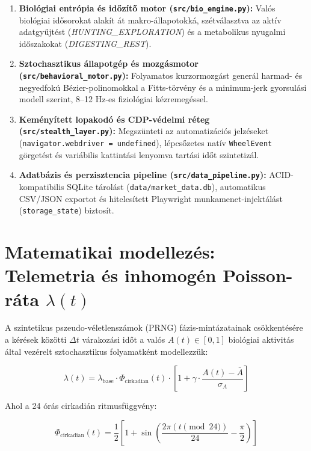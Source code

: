 \documentclass[11pt,a4paper]{article}
\begin{document}
\begin{enumerate}
    \item \textbf{Biológiai entrópia és időzítő motor (\texttt{src/bio\_engine.py}):} 
    Valós biológiai idősorokat alakít át makro-állapotokká, szétválasztva az aktív adatgyűjtést (\textit{HUNTING\_EXPLORATION}) és a metabolikus nyugalmi időszakokat (\textit{DIGESTING\_REST}).
    
    \item \textbf{Sztochasztikus állapotgép és mozgásmotor (\texttt{src/behavioral\_motor.py}):} 
    Folyamatos kurzormozgást generál harmad- és negyedfokú Bézier-polinomokkal a Fitts-törvény és a minimum-jerk gyorsulási modell szerint, 8--12 Hz-es fiziológiai kézremegéssel.
    
    \item \textbf{Keményített lopakodó és CDP-védelmi réteg (\texttt{src/stealth\_layer.py}):} 
    Megszünteti az automatizációs jelzéseket (\texttt{navigator.webdriver = undefined}), lépcsőzetes natív \texttt{WheelEvent} görgetést és variábilis kattintási lenyomva tartási időt szintetizál.
    
    \item \textbf{Adatbázis és perzisztencia pipeline (\texttt{src/data\_pipeline.py}):} 
    ACID-kompatibilis SQLite tárolást (\texttt{data/market\_data.db}), automatikus CSV/JSON exportot és hitelesített Playwright munkamenet-injektálást (\texttt{storage\_state}) biztosít.
\end{enumerate}

\section{Matematikai modellezés: Telemetria és inhomogén Poisson-ráta $\lambda(t)$}

A szintetikus pszeudo-véletlenszámok (PRNG) fázis-mintázatainak csökkentésére a kérések közötti $\Delta t$ várakozási időt a valós $A(t) \in [0, 1]$ biológiai aktivitás által vezérelt sztochasztikus folyamatként modellezzük:

\begin{equation}
\lambda(t) = \lambda_{\text{base}} \cdot \Phi_{\text{cirkadian}}(t) \cdot \left[1 + \gamma \cdot \frac{A(t) - \bar{A}}{\sigma_A}\right]
\end{equation}

\noindent Ahol a 24 órás cirkadián ritmusfüggvény:

\begin{equation}
\Phi_{\text{cirkadian}}(t) = \frac{1}{2} \left[1 + \sin\left(\frac{2\pi (t \pmod{24})}{24} - \frac{\pi}{2}\right)\right]
\end{equation}
\end{document}
